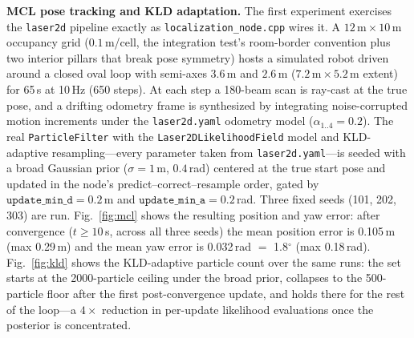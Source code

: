 \textbf{MCL pose tracking and KLD adaptation.}
The first experiment exercises the \texttt{laser2d} pipeline exactly as
\texttt{localization\_node.cpp} wires it. A $12\,\mathrm{m} \times
10\,\mathrm{m}$ occupancy grid ($0.1$\,m/cell, the integration test's
room-border convention plus two interior pillars that break pose
symmetry) hosts a simulated robot driven around a closed oval loop with
semi-axes $3.6\,\mathrm{m}$ and $2.6\,\mathrm{m}$
($7.2\,\mathrm{m} \times 5.2\,\mathrm{m}$ extent) for 65\,s at 10\,Hz
(650 steps). At each step a 180-beam scan is ray-cast at the true pose,
and a drifting odometry frame is synthesized by integrating
noise-corrupted motion increments under the \texttt{laser2d.yaml}
odometry model ($\alpha_{1..4}=0.2$). The real
\texttt{ParticleFilter} with the \texttt{Laser2DLikelihoodField} model
and KLD-adaptive resampling---every parameter taken from
\texttt{laser2d.yaml}---is seeded with a broad Gaussian prior
($\sigma = 1$\,m, $0.4$\,rad) centered at the true start pose and
updated in the node's
predict--correct--resample order, gated by
$\texttt{update\_min\_d} = 0.2$\,m and
$\texttt{update\_min\_a} = 0.2$\,rad. Three fixed seeds (101, 202, 303)
are run. Fig.~\ref{fig:mcl} shows the resulting position and yaw error:
after convergence ($t \geq 10$\,s, across all three seeds) the mean
position error is 0.105\,m (max 0.29\,m) and the mean yaw error is
0.032\,rad $=$ 1.8$^\circ$ (max 0.18\,rad). Fig.~\ref{fig:kld} shows
the KLD-adaptive particle count over the same runs: the set starts at
the 2000-particle ceiling under the broad prior, collapses to the
500-particle floor after the first post-convergence update, and holds
there for the rest of the loop---a $4\times$ reduction in per-update
likelihood evaluations once the posterior is concentrated.




